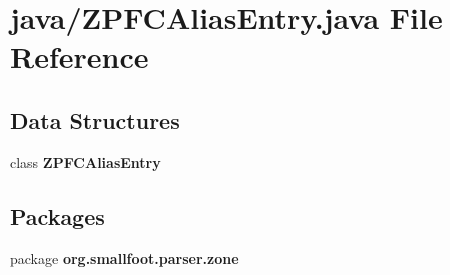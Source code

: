 \section{java/\-Z\-P\-F\-C\-Alias\-Entry.java File Reference}
\label{ZPFCAliasEntry_8java}
\subsection*{Data Structures}
\begin{DoxyCompactItemize}
\item 
class {\bf Z\-P\-F\-C\-Alias\-Entry}
\end{DoxyCompactItemize}
\subsection*{Packages}
\begin{DoxyCompactItemize}
\item 
package {\bf org.\-smallfoot.\-parser.\-zone}
\end{DoxyCompactItemize}
